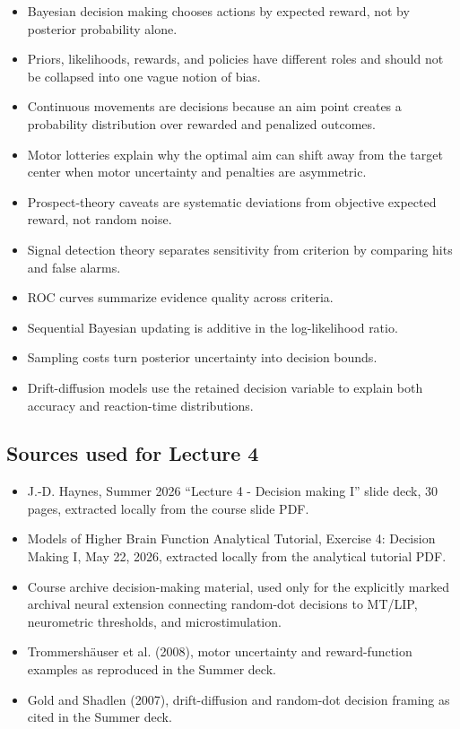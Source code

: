 \begin{itemize}
    \item Bayesian decision making chooses actions by expected reward, not by posterior probability alone.
    \item Priors, likelihoods, rewards, and policies have different roles and should not be collapsed into one vague notion of bias.
    \item Continuous movements are decisions because an aim point creates a probability distribution over rewarded and penalized outcomes.
    \item Motor lotteries explain why the optimal aim can shift away from the target center when motor uncertainty and penalties are asymmetric.
    \item Prospect-theory caveats are systematic deviations from objective expected reward, not random noise.
    \item Signal detection theory separates sensitivity from criterion by comparing hits and false alarms.
    \item ROC curves summarize evidence quality across criteria.
    \item Sequential Bayesian updating is additive in the log-likelihood ratio.
    \item Sampling costs turn posterior uncertainty into decision bounds.
    \item Drift-diffusion models use the retained decision variable to explain both accuracy and reaction-time distributions.
\end{itemize}

\subsection*{Sources used for Lecture 4}

\begin{itemize}
    \item J.-D. Haynes, Summer 2026 ``Lecture 4 - Decision making I'' slide deck, 30 pages, extracted locally from the course slide PDF.
    \item Models of Higher Brain Function Analytical Tutorial, Exercise 4: Decision Making I, May 22, 2026, extracted locally from the analytical tutorial PDF.
    \item Course archive decision-making material, used only for the explicitly marked archival neural extension connecting random-dot decisions to MT/LIP, neurometric thresholds, and microstimulation.
    \item Trommersh\"auser et al. (2008), motor uncertainty and reward-function examples as reproduced in the Summer deck.
    \item Gold and Shadlen (2007), drift-diffusion and random-dot decision framing as cited in the Summer deck.
\end{itemize}
